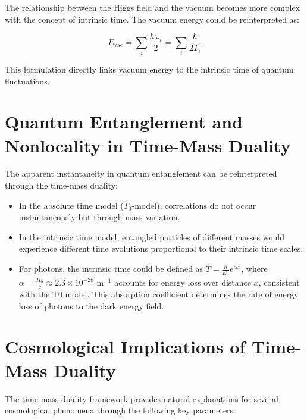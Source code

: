 \documentclass{article}
\begin{document}
	The relationship between the Higgs field and the vacuum becomes more complex with the concept of intrinsic time. The vacuum energy could be reinterpreted as:
	
	\begin{equation}
		E_\text{vac} = \sum_i \frac{\hbar \omega_i}{2} = \sum_i \frac{\hbar}{2T_i}
	\end{equation}
	
	This formulation directly links vacuum energy to the intrinsic time of quantum fluctuations.
	
	\section{Quantum Entanglement and Nonlocality in Time-Mass Duality}
	
	The apparent instantaneity in quantum entanglement can be reinterpreted through the time-mass duality:
	
	\begin{itemize}
		\item In the absolute time model (\(T_0\)-model), correlations do not occur instantaneously but through mass variation.
		\item In the intrinsic time model, entangled particles of different masses would experience different time evolutions proportional to their intrinsic time scales.
		\item For photons, the intrinsic time could be defined as \(T = \frac{\hbar}{E_{\gamma}} e^{\alpha x}\), where \(\alpha = \frac{H_0}{c} \approx 2.3 \times 10^{-28} \text{ m}^{-1}\) accounts for energy loss over distance \(x\), consistent with the T0 model. This absorption coefficient determines the rate of energy loss of photons to the dark energy field.
	\end{itemize}
	
	\section{Cosmological Implications of Time-Mass Duality}
	
	The time-mass duality framework provides natural explanations for several cosmological phenomena through the following key parameters:
	
\end{document}
